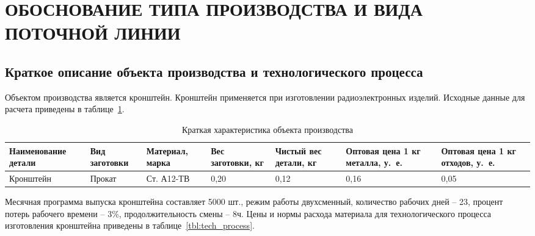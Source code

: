 \section[Обоснование типа производства и вида поточной линии]{
  ОБОСНОВАНИЕ ТИПА ПРОИЗВОДСТВА И ВИДА \\
  ПОТОЧНОЙ ЛИНИИ
}
\label{sec:choice}

\subsection{
  Краткое описание объекта производства и 
  технологического процесса
}

Объектом производства является кронштейн.
Кронштейн применяется при изготовлении радиоэлектронных изделий.
Исходные данные для расчета приведены в таблице~\ref{tbl:piece_description}.

\begin{table} [h!]
  \caption{
    Краткая характеристика объекта производства
  }\label{tbl:piece_description}
  {\small
    \begin{tabular}{| m{2.7cm} | m{1.7cm} | m{2.1cm} | m{1.9cm} | m{1.4cm} | m{1.8cm} | m{1.8cm} |}
      \hline
      Наименование детали & Вид заготовки & Материал, марка
      & Вес заготовки, кг & Чистый вес детали, кг
      & Оптовая цена 1 кг металла, у.~е. & Оптовая цена 1 кг отходов, у.~е. \\
      \hline
      Кронштейн & Прокат & Ст. А12-ТВ
      & 0{,}20 & 0{,}12 
      & 0{,}16 & 0{,}05 \\
      \hline
    \end{tabular}
  }
\end{table}

Месячная программа выпуска кронштейна составляет 5000 шт.,
режим работы двухсменный, количество рабочих дней – 23,
процент потерь рабочего времени – 3\%, продолжительность смены – 8ч.
Цены и нормы расхода материала для технологического 
процесса изготовления кронштейна приведены в таблице~\ref{tbl:tech_process}.

